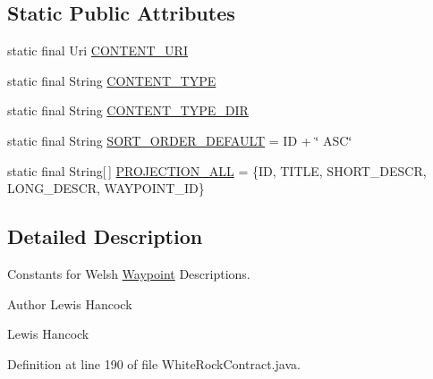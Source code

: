 \subsection*{Static Public Attributes}
\begin{DoxyCompactItemize}
\item 
static final Uri \hyperlink{classuk_1_1ac_1_1swan_1_1digitaltrails_1_1database_1_1_white_rock_contract_1_1_welsh_waypoint_descriptions_a17a92013f31761a4cd010913196a57cb}{C\+O\+N\+T\+E\+N\+T\+\_\+\+U\+R\+I}
\item 
static final String \hyperlink{classuk_1_1ac_1_1swan_1_1digitaltrails_1_1database_1_1_white_rock_contract_1_1_welsh_waypoint_descriptions_ae6176ca7e1479e47da4e5bb4a1881b84}{C\+O\+N\+T\+E\+N\+T\+\_\+\+T\+Y\+P\+E}
\item 
static final String \hyperlink{classuk_1_1ac_1_1swan_1_1digitaltrails_1_1database_1_1_white_rock_contract_1_1_welsh_waypoint_descriptions_a4100cbe26c0e23fea1e47e565dc38930}{C\+O\+N\+T\+E\+N\+T\+\_\+\+T\+Y\+P\+E\+\_\+\+D\+I\+R}
\item 
static final String \hyperlink{classuk_1_1ac_1_1swan_1_1digitaltrails_1_1database_1_1_white_rock_contract_1_1_welsh_waypoint_descriptions_a04df0e685de90581003390e78de633d2}{S\+O\+R\+T\+\_\+\+O\+R\+D\+E\+R\+\_\+\+D\+E\+F\+A\+U\+L\+T} = I\+D + \char`\"{} A\+S\+C\char`\"{}
\item 
static final String\mbox{[}$\,$\mbox{]} \hyperlink{classuk_1_1ac_1_1swan_1_1digitaltrails_1_1database_1_1_white_rock_contract_1_1_welsh_waypoint_descriptions_a84436c300adb027cb56d0ffc66c3cdb5}{P\+R\+O\+J\+E\+C\+T\+I\+O\+N\+\_\+\+A\+L\+L} = \{I\+D, T\+I\+T\+L\+E, S\+H\+O\+R\+T\+\_\+\+D\+E\+S\+C\+R, L\+O\+N\+G\+\_\+\+D\+E\+S\+C\+R, W\+A\+Y\+P\+O\+I\+N\+T\+\_\+\+I\+D\}
\end{DoxyCompactItemize}


\subsection{Detailed Description}
Constants for Welsh \hyperlink{classuk_1_1ac_1_1swan_1_1digitaltrails_1_1database_1_1_white_rock_contract_1_1_waypoint}{Waypoint} Descriptions. 

\begin{DoxyAuthor}{Author}
Lewis Hancock 

Lewis Hancock 
\end{DoxyAuthor}


Definition at line 190 of file White\+Rock\+Contract.\+java.



